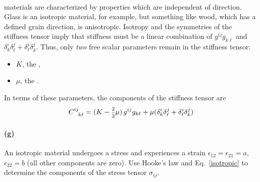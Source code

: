 \documentclass{article}
\begin{document}
\paragraph{}
 materials are characterized by properties which are independent of direction.  
Glass is an isotropic material, for example, but something like 
wood, which has a defined grain direction, is anisotropic.  
Isotropy and the symmetries of the stiffness tensor imply that stiffness must be a linear combination of $g^{ij}g_{k\ell}$ and 
$\delta^{i}_{k}\delta^{j}_{\ell} + \delta^{i}_{\ell}\delta^{j}_{k}$.  Thus, only \emph{two} free scalar parameters remain in the stiffness tensor:
	\begin{itemize} 
		\item $K$, the ,
		\item $\mu$, the .
	\end{itemize}
In terms of these parameters, the components of the stiffness tensor are
	\begin{equation}
		C^{ij}_{\phantom{ij}k\ell} = (K-\fracsm{2}{3}\mu)\,g^{ij}g_{k\ell} + \mu(\delta^{i}_{k}\delta^{j}_{\ell} + \delta^{i}_{\ell}\delta^{j}_{k})
	\label{isotropic}
	\end{equation}

\paragraph{(g)}
An isotropic material undergoes a stress and experiences a strain $\epsilon_{12} = \epsilon_{21} = a$, $\epsilon_{22} = b$ (all other components are zero).  
Use Hooke's law and Eq.~\ref{isotropic} to determine the components of the stress tensor $\sigma_{ij}$.
\end{document}
